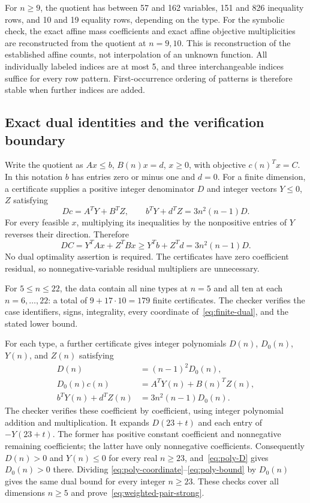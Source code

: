For $n\ge9$, the quotient has between 57 and 162 variables, 151 and 826
inequality rows, and 10 and 19 equality rows, depending on the type. For the symbolic
check, the exact affine mass coefficients and exact affine objective
multiplicities are reconstructed from the quotient at $n=9,10$. This is
reconstruction of the established affine counts, not interpolation of an
unknown function. All individually labeled indices are at most 5, and
three interchangeable indices suffice for every row pattern. First-occurrence
ordering of patterns is therefore stable when further indices are added.

\subsection{Exact dual identities and the verification boundary}\label{subsec:pair-certificates}

Write the quotient as $Ax\le b$, $B(n)x=d$, $x\ge0$, with objective
$c(n)^Tx=C$. In this notation $b$ has entries zero or minus one and $d=0$.
For a finite dimension, a certificate supplies a positive integer
denominator $D$ and integer vectors $Y\le0$, $Z$ satisfying
\begin{equation}\label{eq:finite-dual}
 D c=A^TY+B^TZ,\qquad b^TY+d^TZ=3n^2(n-1)D.
\end{equation}
For every feasible $x$, multiplying its inequalities by the nonpositive
entries of $Y$ reverses their direction. Therefore
\[
 D C=Y^TAx+Z^TBx\ge Y^Tb+Z^Td=3n^2(n-1)D.
\]
No dual optimality assertion is required. The certificates have zero
coefficient residual, so nonnegative-variable residual multipliers are
unnecessary.

For $5\le n\le22$, the data contain all nine types at $n=5$ and all
ten at each $n=6,\ldots,22$: a total of $9+17\cdot10=179$ finite
certificates. The checker verifies the case identifiers, signs, integrality,
every coordinate of~\eqref{eq:finite-dual}, and the stated lower bound.

For each type, a further certificate gives integer polynomials
$D(n)$, $D_0(n)$, $Y(n)$, and $Z(n)$ satisfying
\begin{align}
 D(n)&=(n-1)^2D_0(n),\label{eq:poly-D}\\
 D_0(n)c(n)&=A^TY(n)+B(n)^TZ(n),\label{eq:poly-coordinate}\\
 b^TY(n)+d^TZ(n)&=3n^2(n-1)D_0(n).\label{eq:poly-bound}
\end{align}
The checker verifies these coefficient by coefficient, using integer
polynomial addition and multiplication. It expands $D(23+t)$ and each
entry of $-Y(23+t)$. The former has positive constant coefficient and
nonnegative remaining coefficients; the latter have only nonnegative
coefficients. Consequently $D(n)>0$ and $Y(n)\le0$ for every real
$n\ge23$, and~\eqref{eq:poly-D} gives $D_0(n)>0$ there. Dividing
\eqref{eq:poly-coordinate}--\eqref{eq:poly-bound} by $D_0(n)$ gives
the same dual bound for every integer $n\ge23$. These checks cover
all dimensions $n\ge5$ and prove~\eqref{eq:weighted-pair-strong}.

